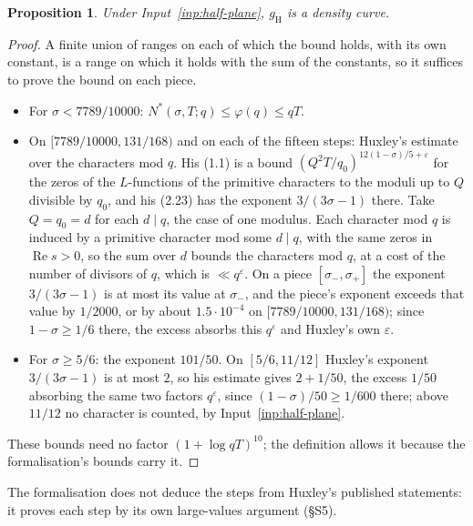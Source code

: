 \documentclass[11pt]{article}
\newtheorem{proposition}[theorem]{Proposition}
\theoremstyle{definition}
\begin{document}
\begin{proposition}\label{prop:curve}
Under Input~\ref{inp:half-plane}, $g_{\mathrm H}$ is a density curve.
\end{proposition}

\begin{proof}
A finite union of ranges on each of which the bound holds, with its own constant, is a range on which it holds with
the sum of the constants, so it suffices to prove the bound on each piece.
\begin{itemize}
\item For $\sigma < 7789/10000$: $N^*(\sigma, T; q) \le \varphi(q) \le qT$.
\item On $[7789/10000, 131/168)$ and on each of the fifteen steps: Huxley's estimate \cite{huxley75} over the
  characters mod $q$. His (1.1) is a bound $(Q^2 T/q_0)^{12(1 - \sigma)/5 + \varepsilon}$ for the zeros of the
  $L$-functions of the primitive characters to the moduli up to $Q$ divisible by $q_0$, and his (2.23) has the
  exponent $3/(3\sigma - 1)$ there. Take $Q = q_0 = d$ for each $d \mid q$, the case of one modulus. Each character
  mod $q$ is induced by a primitive character mod some $d \mid q$, with the same zeros in $\operatorname{Re} s > 0$,
  so the sum over $d$ bounds the characters mod $q$, at a cost of the number of divisors of $q$, which is
  $\ll q^\varepsilon$. On a piece $[\sigma_-, \sigma_+]$ the exponent $3/(3\sigma - 1)$ is at most its value at
  $\sigma_-$, and the piece's exponent exceeds that value by $1/2000$, or by about $1.5 \cdot 10^{-4}$ on
  $[7789/10000, 131/168)$;
  since $1 - \sigma \ge 1/6$ there, the excess absorbs this $q^\varepsilon$ and Huxley's own $\varepsilon$.
\item For $\sigma \ge 5/6$: the exponent $101/50$. On $[5/6, 11/12]$ Huxley's exponent $3/(3\sigma - 1)$ is at most
  $2$, so his estimate gives $2 + 1/50$, the excess $1/50$ absorbing the same two factors $q^\varepsilon$, since
  $(1 - \sigma)/50 \ge 1/600$ there; above $11/12$ no character is counted, by Input~\ref{inp:half-plane}.
\end{itemize}
These bounds need no factor $(1 + \log qT)^{10}$; the definition allows it because the formalisation's bounds carry
it.
\end{proof}

The formalisation does not deduce the steps from Huxley's published statements: it proves each step by its own
large-values argument (\S S5).
\end{document}
